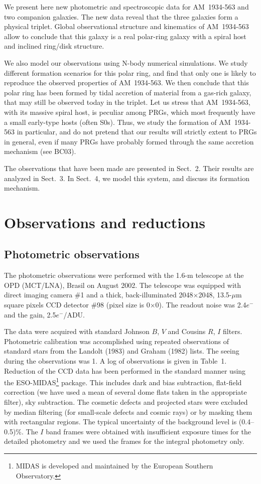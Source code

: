 \documentclass[]{aa}
\begin{document}
We present here new photometric and spectroscopic data for
AM~1934-563 and two companion galaxies. The new data 
reveal that the three galaxies form a physical triplet. Global observational 
structure and kinematics of AM~1934-563 allow to conclude 
that this galaxy is a real polar-ring galaxy with a spiral
host and inclined ring/disk structure.

We also model our observations using N-body numerical simulations. We 
study different formation scenarios for this polar ring, and find that 
only one is likely to reproduce the observed properties of AM~1934-563. 
We then conclude that this polar ring has been formed by tidal accretion 
of material from a gas-rich galaxy, that may still be observed today in 
the triplet. 
Let us stress that AM~1934-563, with its massive spiral host, 
is peculiar among PRGs, which most frequently have a small early-type hosts 
(often S0s). Thus, we study the formation of AM~1934-563 in particular, 
and do not pretend that our results will strictly extent to PRGs in general, 
even if many PRGs have probably formed through the same accretion mechanism (see BC03).

The observations that have been made are presented in Sect.~2. Their 
results are analyzed in Sect.~3. In Sect.~4, we model this system, 
and discuss its formation mechanism.

\section{Observations and reductions}

\subsection{Photometric observations}

The photometric observations were performed with the 1.6-m
telescope at the OPD (MCT/LNA), Brasil on August 2002. 
The telescope was equipped with direct imaging camera \#1 and
a thick, back-illuminated 2048$\times$2048, 13.5-$\mu$m square
pixels CCD detector \#98 (pixel size is 0$\times$0).
The readout noise was 2.4$e^-$ and the gain, 2.5$e^-$/ADU.

The data were acquired with standard Johnson $B$, $V$ and Cousins
$R$, $I$ filters. Photometric calibration was accomplished using repeated
observations of standard stars from the Landolt (1983) and 
Graham (1982) lists. The seeing during the observations was 1. 
A log of observations is given in Table~1. Reduction of the CCD data 
has been performed in the standard manner using the 
ESO-MIDAS\footnote{MIDAS is 
developed and maintained by the European Southern Observatory.}
package. This includes dark and bias subtraction, flat-field correction
(we have used a mean of several dome flats taken in the appropriate
filter), sky subtraction. The cosmetic defects and projected stars
were excluded by median filtering (for small-scale defects and cosmic
rays) or by masking them with rectangular regions. The typical
uncertainty of the background level is (0.4--0.5)\%.
The $I$ band frames were obtained with insufficient exposure times for
the detailed photometry and we used the frames for the integral photometry only.
\end{document}
